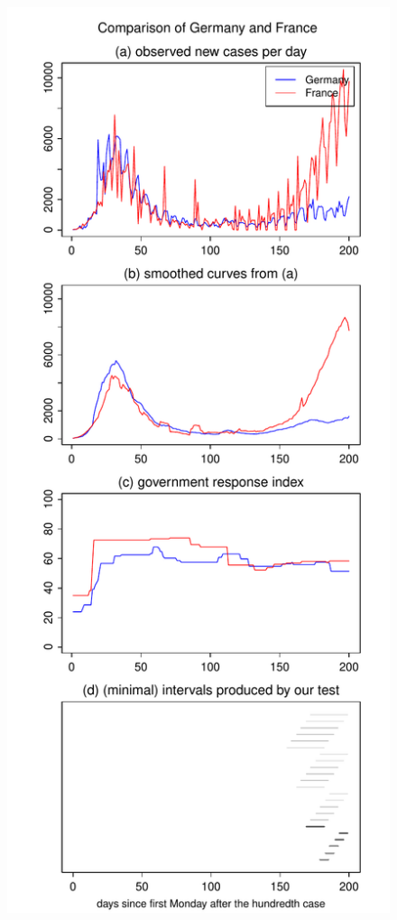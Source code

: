\documentclass[a4paper,12pt]{article}
\numberwithin{equation}{section}
\begin{document}
\begin{figure}[h!]
\begin{minipage}[t]{0.49\textwidth}
\includegraphics[width=\textwidth]{plots/DEU_vs_FRA_long}

\end{minipage}
\end{figure}
\end{document}
